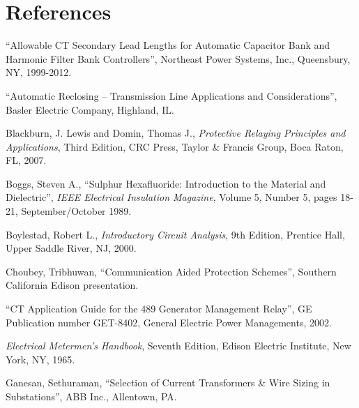 \filbreak
\section*{References}


\noindent
``Allowable CT Secondary Lead Lengths for Automatic Capacitor Bank and Harmonic Filter Bank Controllers'', Northeast Power Systems, Inc., Queensbury, NY, 1999-2012.

\vskip 10pt

\noindent
``Automatic Reclosing -- Transmission Line Applications and Considerations'', Basler Electric Company, Highland, IL.

\vskip 10pt

\noindent
Blackburn, J. Lewis and Domin, Thomas J., \textit{Protective Relaying Principles and Applications}, Third Edition, CRC Press, Taylor \& Francis Group, Boca Raton, FL, 2007.

\vskip 10pt

\noindent
Boggs, Steven A., ``Sulphur Hexafluoride: Introduction to the Material and Dielectric'', \textit{IEEE Electrical Insulation Magazine}, Volume 5, Number 5, pages 18-21, September/October 1989.

\vskip 10pt

\noindent
Boylestad, Robert L., \textit{Introductory Circuit Analysis}, 9th Edition, Prentice Hall, Upper Saddle River, NJ, 2000.

\vskip 10pt

\noindent
Choubey, Tribhuwan, ``Communication Aided Protection Schemes'', Southern California Edison presentation.

\vskip 10pt

\noindent
``CT Application Guide for the 489 Generator Management Relay'', GE Publication number GET-8402, General Electric Power Managements, 2002.

\vskip 10pt

\noindent
\textit{Electrical Metermen's Handbook}, Seventh Edition, Edison Electric Institute, New York, NY, 1965.

\vskip 10pt

\noindent
Ganesan, Sethuraman, ``Selection of Current Transformers \& Wire Sizing in Substations'', ABB Inc., Allentown, PA.

